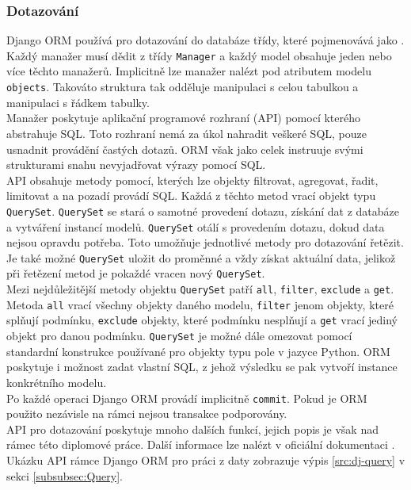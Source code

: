 \documentclass[ing,male,java,dept456]{diploma}						%
\begin{document}
\subsubsection{Dotazování}

Django ORM používá pro dotazování do databáze třídy, které pojmenovává jako . Každý manažer musí dědit z třídy \lstinline[style=custompython]|Manager| a každý model obsahuje jeden nebo více těchto manažerů. Implicitně lze manažer nalézt pod atributem modelu \lstinline[style=inlinepython]|objects|. Takováto struktura tak odděluje manipulaci s celou tabulkou a manipulaci s řádkem tabulky. \\
Manažer poskytuje aplikační programové rozhraní (API) pomocí kterého abstrahuje SQL. Toto rozhraní nemá za úkol nahradit veškeré SQL, pouze usnadnit provádění častých dotazů. ORM však jako celek instruuje svými strukturami snahu nevyjadřovat výrazy pomocí SQL. \\
API obsahuje metody pomocí, kterých lze objekty filtrovat, agregovat, řadit, limitovat a na pozadí provádí SQL. Každá z těchto metod vrací objekt typu \lstinline[style=inlinepython]|QuerySet|. \lstinline[style=inlinepython]|QuerySet| se stará o samotné provedení dotazu, získání dat z databáze a vytváření instancí modelů. \lstinline[style=inlinepython]|QuerySet| otálí s provedením dotazu, dokud data nejsou opravdu potřeba. Toto umožňuje jednotlivé metody pro dotazování řetězit. Je také možné \lstinline[style=inlinepython]|QuerySet| uložit do proměnné a vždy získat aktuální data, jelikož při řetězení metod je pokaždé vracen nový \lstinline[style=inlinepython]|QuerySet|. \\
Mezi nejdůležitější metody objektu \lstinline[style=inlinepython]|QuerySet| patří \lstinline[style=inlinepython]|all|, \lstinline[style=inlinepython]|filter|, \lstinline[style=inlinepython]|exclude| a \lstinline[style=inlinepython]|get|. Metoda \lstinline[style=inlinepython]|all| vrací všechny objekty daného modelu, \lstinline[style=inlinepython]|filter| jenom objekty, které splňují podmínku, \lstinline[style=inlinepython]|exclude| objekty, které podmínku nesplňují a \lstinline[style=inlinepython]|get| vrací jediný objekt pro danou podmínku.
\lstinline[style=inlinepython]|QuerySet| je možné dále omezovat pomocí standardní konstrukce používané pro objekty typu pole v jazyce Python. ORM poskytuje i možnost zadat vlastní SQL, z jehož výsledku se pak vytvoří instance konkrétního modelu. \\
Po každé operaci Django ORM provádí implicitně \lstinline[style=inlinepython]|commit|. Pokud je ORM použito nezávisle na rámci nejsou transakce podporovány. \\
API pro dotazování poskytuje mnoho dalších funkcí, jejich popis je však nad rámec této diplomové práce. Další informace lze nalézt v oficiální dokumentaci \cite{djangodoc}. Ukázku API rámce Django ORM pro práci z daty zobrazuje výpis \ref{src:dj-query} v sekci \ref{subsubsec:Query}.
\end{document}
